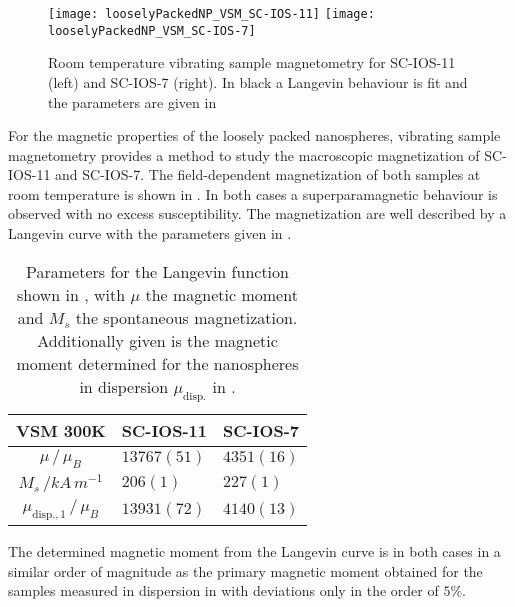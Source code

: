 \documentclass[\main/dresen_thesis.tex]{subfiles}
\begin{document}
  \label{sec:looselyPackedNS:layer:vsm}
  \begin{figure}[tb]
    \centering
    \texttt{[image: looselyPackedNP\_VSM\_SC-IOS-11]}
    \texttt{[image: looselyPackedNP\_VSM\_SC-IOS-7]}
    \caption{\label{fig:looselyPackedNP:layer:vsm}Room temperature vibrating sample magnetometry for SC-IOS-11 (left) and SC-IOS-7 (right). In black a Langevin behaviour is fit and the parameters are given in }
  \end{figure}

  For the magnetic properties of the loosely packed nanospheres, vibrating sample magnetometry provides a method to study the macroscopic magnetization of SC-IOS-11 and SC-IOS-7.
  The field-dependent magnetization of both samples at room temperature is shown in .
  In both cases a superparamagnetic behaviour is observed with no excess susceptibility.
  The magnetization are well described by a Langevin curve with the parameters given in .

  \begin{table}[!htbp]
    \centering
    \caption{\label{tab:looselyPackedNP:layer:vsm}Parameters for the Langevin function shown in , with $\mu$ the magnetic moment and $M_s$ the spontaneous magnetization. Additionally given is the magnetic moment determined for the nanospheres in dispersion $\mu_\mathrm{disp.}$ in .}
    \begin{tabular}{ c | l | l }
      \rule{0pt}{2ex} \textbf{VSM \@ 300K} & SC-IOS-11 & SC-IOS-7 \\
      \hline
      \rule{0pt}{2ex} $\mu \, / \, \mu_B$                       & $13767(51)$    & $4351(16)$\\
      \rule{0pt}{2ex} $M_{s} \, /  \unit{kA\,m^{-1}}$           & $206(1)$       & $227(1)$  \\
      \hline
      $\mu_\mathrm{disp., 1} \, / \, \mu_B$                     & $13931(72)$   & $4140(13)$\\
      \hline
    \end{tabular}
  \end{table}

  The determined magnetic moment from the Langevin curve is in both cases in a similar order of magnitude as the primary magnetic moment obtained for the samples measured in dispersion in  with deviations only in the order of $5 \%$.
\end{document}
